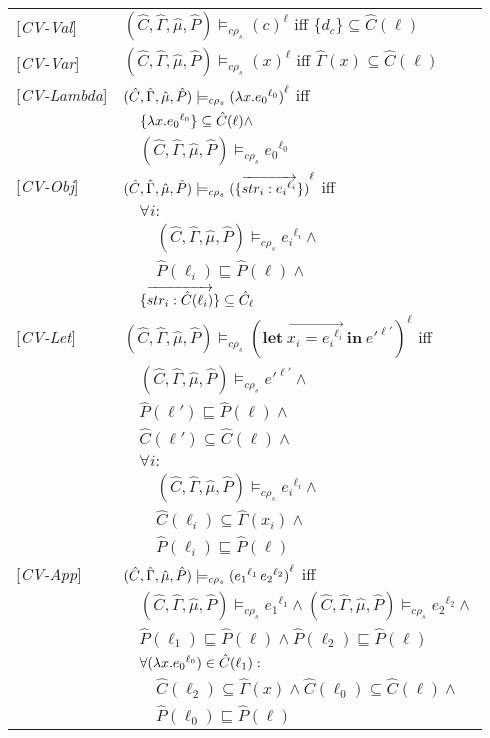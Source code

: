 \documentclass[[12pt,a4paper,twoside,openrigh]{article}
\newcommand{\Cat}[0]{\hat{C}}
\newcommand{\muat}[0]{\hat{\mu}}
\newcommand{\Env}[0]{\hat{\Gamma}}
\newcommand{\Pat}[0]{\hat{P}}
\newcommand{\cenvs}{(\Cat,\Env,\muat,\Pat)}
\newcommand{\ccest}[1]{\cenvs \models_{c \rho_s} #1}
\newcommand{\ccestl}[1]{\cenvs \models_{c \rho_s} {(#1)}^{\ell}}
\newcommand{\lbt}[1]{{e_#1}^{\ell_#1}}
\newcommand{\letexprs}[3]{\mathbf{let}\ \vec{#1 = #2}\ \mathbf{in}\ #3}
\begin{document}
\begin{tabular}{l l l l}
{[\textit{CV-Val}]}&\multicolumn{3}{l}{$ \ccestl {c} $ iff $\{d_c\} \subseteq \Cat(\ell)$} \\ 
{[\textit{CV-Var}]}&\multicolumn{3}{l}{$ \ccestl {x} $ iff $\Env(x) \subseteq \Cat(\ell)$} \\ 
{[\textit{CV-Lambda}]}&\multicolumn{3}{l}{$ \ccestl {\lam{x}{\lbt 0}} $ iff}\\
&&\multicolumn{2}{l}{$\{\lam{x}{\lbt 0}\} \subseteq \Cat(\ell) \wedge $}\\
&&\multicolumn{2}{l}{$ \ccest {\lbt 0}$}\\
{[\textit{CV-Obj}]}&\multicolumn{3}{l}{$ \ccestl {\rec{\vec{str_i : \lbt i}}}$ iff}\\
&&\multicolumn{2}{l}{$\forall i:$}\\
&&&$\ccest {\lbt i} \wedge$\\
&&&$\Pat(\ell_i) \sqsubseteq \Pat(\ell) \wedge$\\ 
&&\multicolumn{2}{l}{$\rec{\vec{str_i : \Cat(\ell_i)}} \subseteq \Cat_\ell $} \\
{[\textit{CV-Let}]}&\multicolumn{3}{l}{$ \ccestl {\letexprs{x_i}{\lbt i}{{e'}^{\ell'}}}$ iff}\\
&&\multicolumn{2}{l}{$ \ccest {{e'}^{\ell'}} \wedge$} \\
&&\multicolumn{2}{l}{$ \Pat(\ell') \sqsubseteq \Pat(\ell) \wedge$}\\
&&\multicolumn{2}{l}{$ \Cat(\ell') \subseteq \Cat(\ell) \wedge$}\\
&&\multicolumn{2}{l}{$ \forall i:$}\\
&&&$\ccest {{e_i}^{\ell_i}} \wedge$ \\
&&& $ \Cat(\ell_i) \subseteq \Env(x_i) \wedge$ \\
&&& $ \Pat(\ell_i) \sqsubseteq \Pat(\ell) $ \\
{[\textit{CV-App}]}&\multicolumn{3}{l}{$ \ccestl {\appl {\lbt 1} {\lbt 2}}$ iff}\\
&&\multicolumn{2}{l}{$\ccest {\lbt 1} \wedge \ccest {\lbt 2} \wedge$} \\
&&\multicolumn{2}{l}{$\Pat(\ell_1) \sqsubseteq \Pat(\ell) \wedge \Pat(\ell_2) \sqsubseteq \Pat(\ell)$} \\
&&\multicolumn{2}{l}{$\forall (\lam{x}{\lbt 0}) \in \Cat(\ell_1) :$}\\
&&&$\Cat(\ell_2) \subseteq \Env(x) \wedge \Cat(\ell_0) \subseteq \Cat(\ell) \wedge$\\
&&&$\Pat(\ell_0) \sqsubseteq \Pat(\ell) $\\

\end{tabular}
\end{document}
